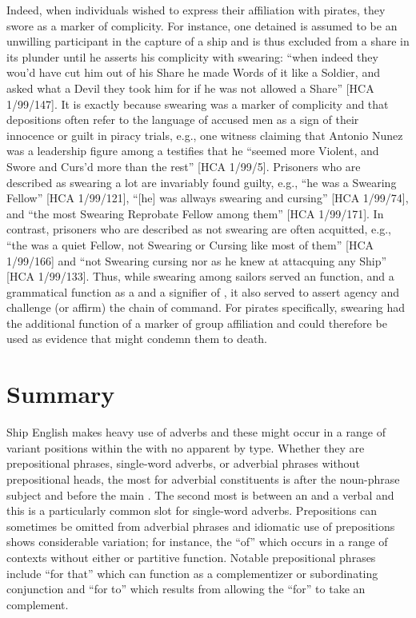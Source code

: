 Indeed, when individuals wished to express their affiliation with pirates, they swore as a marker of complicity. For instance, one detained  is assumed to be an unwilling participant in the capture of a ship and is thus excluded from a share in its plunder until he asserts his complicity with swearing: “when indeed they wou’d have cut him out of his Share he made Words of it like a Soldier, and asked what a Devil they took him for if he was not allowed a Share” [HCA 1/99/147]. It is exactly because swearing was a marker of complicity and  that depositions often refer to the language of accused men as a sign of their innocence or guilt in piracy trials, e.g., one witness claiming that Antonio Nunez was a leadership figure among a   testifies that he “seemed more Violent, and Swore and Curs’d more than the rest” [HCA 1/99/5]. Prisoners who are described as swearing a lot are invariably found guilty, e.g., “he was a Swearing Fellow” [HCA 1/99/121], “[he] was allways swearing and cursing” [HCA 1/99/74], and “the most Swearing Reprobate Fellow among them” [HCA 1/99/171]. In contrast, prisoners who are described as not swearing are often acquitted, e.g., “the  was a quiet Fellow, not Swearing or Cursing like most of them” [HCA 1/99/166] and “not Swearing cursing nor as he knew at attacquing any Ship” [HCA 1/99/133]. Thus, while swearing among sailors served an  function, and a grammatical function as a  and a signifier of , it also served to assert agency and challenge (or affirm) the chain of command.  For pirates specifically, swearing had the additional function of a marker of group affiliation and could therefore be used as evidence that might condemn them to death. 

\section{{Summary}}%

Ship English makes heavy use of adverbs and these might occur in a range of variant positions within the  with no apparent  by  type. Whether they are prepositional phrases, single-word adverbs, or adverbial phrases without prepositional heads, the most  for adverbial constituents is after the noun-phrase subject and before the main . The second most  is between an  and a verbal  and this is a particularly common slot for single-word adverbs. Prepositions can sometimes be omitted from adverbial phrases and idiomatic use of prepositions shows considerable variation; for instance, the  “of” which occurs in a range of contexts without either  or partitive function. Notable prepositional phrases include “for that” which can function as a complementizer or subordinating conjunction and “for to” which results from allowing the  “for” to take an   complement. 

